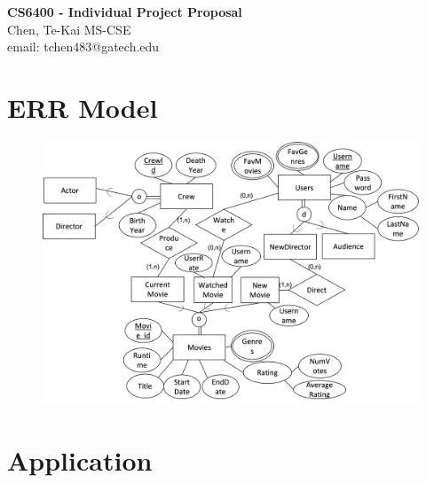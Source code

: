 \documentclass[11pt]{article}
\begin{document}
\thispagestyle{empty}

\begin{titlepage}
    \begin{center}
        \vspace*{1cm}
        \Huge
        \textbf{CS6400 - Individual Project Proposal\\}
        \vspace{0.8cm}
        \Large
        Chen, Te-Kai MS-CSE\\
        email: tchen483@gatech.edu\\
             
    \end{center}
 \end{titlepage}
\pagestyle{fancy}
\fancyhf{}

\section{ERR Model}

\begin{figure}[h!]
    \centering
    \includegraphics[scale=0.5]{Revised_EER.png}
    \label{fig:ER_Model}
\end{figure}
\section{Application}
\end{document}
